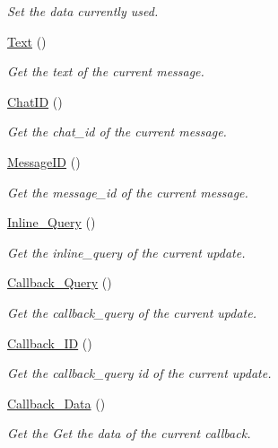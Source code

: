 \begin{DoxyCompactItemize}
\begin{DoxyCompactList}\small\item\em Set the data currently used. \end{DoxyCompactList}\item 
\hyperlink{class_telegram_a950a98ae75562dc9c6a458acbd330143}{Text} ()
\begin{DoxyCompactList}\small\item\em Get the text of the current message. \end{DoxyCompactList}\item 
\hyperlink{class_telegram_a4b624bab3560ed1e761aba1e7431cb6e}{Chat\+I\+D} ()
\begin{DoxyCompactList}\small\item\em Get the chat\+\_\+id of the current message. \end{DoxyCompactList}\item 
\hyperlink{class_telegram_a957f0d35d7a8cabb6116cc7bf51ceac2}{Message\+I\+D} ()
\begin{DoxyCompactList}\small\item\em Get the message\+\_\+id of the current message. \end{DoxyCompactList}\item 
\hyperlink{class_telegram_a27937704e98b35ccaf2066aa74b1fbe1}{Inline\+\_\+\+Query} ()
\begin{DoxyCompactList}\small\item\em Get the inline\+\_\+query of the current update. \end{DoxyCompactList}\item 
\hyperlink{class_telegram_a891f961aa0d3272c01ac9fe64f10a714}{Callback\+\_\+\+Query} ()
\begin{DoxyCompactList}\small\item\em Get the callback\+\_\+query of the current update. \end{DoxyCompactList}\item 
\hyperlink{class_telegram_a61006cd19798be37ae51af5bc405ec71}{Callback\+\_\+\+I\+D} ()
\begin{DoxyCompactList}\small\item\em Get the callback\+\_\+query id of the current update. \end{DoxyCompactList}\item 
\hyperlink{class_telegram_a0df77a257a02ef572ca7d745f659e98d}{Callback\+\_\+\+Data} ()
\begin{DoxyCompactList}\small\item\em Get the Get the data of the current callback. \end{DoxyCompactList}\item 

\end{DoxyCompactItemize}
